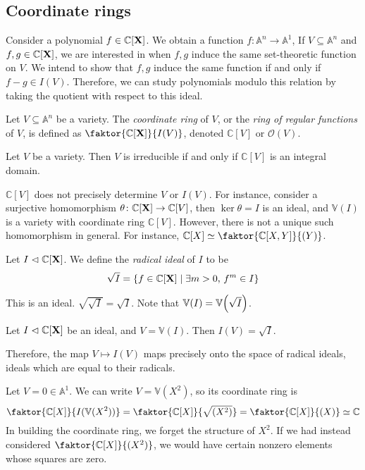 \subsection{Coordinate rings}
Consider a polynomial \( f \in \mathbb C[\vb X] \).
We obtain a function \( f \colon \mathbb A^n \to \mathbb A^1 \),
If \( V \subseteq \mathbb A^n \) and \( f, g \in \mathbb C[\vb X] \), we are interested in when \( f, g \) induce the same set-theoretic function on \( V \).
We intend to show that \( f, g \) induce the same function if and only if \( f - g \in I(V) \).
Therefore, we can study polynomials modulo this relation by taking the quotient with respect to this ideal.
\begin{definition}
    Let \( V \subseteq \mathbb A^n \) be a variety.
    The \emph{coordinate ring} of \( V \), or the \emph{ring of regular functions} of \( V \), is defined as \( \faktor{\mathbb C[\vb X]}{I(V)} \), denoted \( \mathbb C[V] \) or \( \mathcal O(V) \).
\end{definition}
\begin{corollary}
    Let \( V \) be a variety.
    Then \( V \) is irreducible if and only if \( \mathbb C[V] \) is an integral domain.
\end{corollary}
\begin{remark}
    \( \mathbb C[V] \) does not precisely determine \( V \) or \( I(V) \).
    For instance, consider a surjective homomorphism \( \theta \colon \mathbb C[\vb X] \to \mathbb C[V] \), then \( \ker \theta = I \) is an ideal, and \( \mathbb V(I) \) is a variety with coordinate ring \( \mathbb C[V] \).
    However, there is not a unique such homomorphism in general.
    For instance, \( \mathbb C[X] \simeq \faktor{\mathbb C[X,Y]}{(Y)} \).
\end{remark}
\begin{definition}
    Let \( I \vartriangleleft \mathbb C[\vb X] \).
    We define the \emph{radical ideal} of \( I \) to be
    \[ \sqrt{I} = \qty{f \in \mathbb C[\vb X] \mid \exists m > 0,\, f^m \in I} \]
\end{definition}
This is an ideal.
\( \sqrt{\sqrt{I}} = \sqrt{I} \).
Note that \( \mathbb V(I) = \mathbb V\qty(\sqrt{I}) \).
\begin{theorem}
    Let \( I \vartriangleleft \mathbb C[\vb X] \) be an ideal, and \( V = \mathbb V(I) \).
    Then \( I(V) = \sqrt{I} \).
\end{theorem}
Therefore, the map \( V \mapsto I(V) \) maps precisely onto the space of radical ideals, ideals which are equal to their radicals.
\begin{example}
    Let \( V = \qty{0} \in \mathbb A^1 \).
    We can write \( V = \mathbb V(X^2) \), so its coordinate ring is
    \[ \faktor{\mathbb C[X]}{I(\mathbb V(X^2))} = \faktor{\mathbb C[X]}{\sqrt{(X^2)}} = \faktor{\mathbb C[X]}{(X)} \simeq \mathbb C \]
    In building the coordinate ring, we forget the structure of \( X^2 \).
    If we had instead considered \( \faktor{\mathbb C[X]}{(X^2)} \), we would have certain nonzero elements whose squares are zero.
\end{example}

